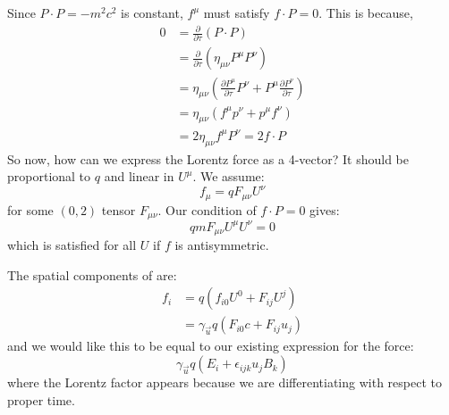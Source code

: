\documentclass[../Main.tex]{subfiles}
\begin{document}
Since $P \cdot P = -m^2 c^2$ is constant, $f^\mu$ must satisfy $f \cdot P = 0$. This is because,
\begin{align*}
    0 &= \frac{\partial}{\partial \tau}(P \cdot P) \\
    &= \frac{\partial }{\partial \tau} \left(\eta_{\mu \nu} P^\mu P^\nu\right) \\
    &= \eta_{\mu \nu} \left(\frac{\partial P^\mu}{\partial \tau} P^\nu + P^\mu \frac{\partial P^\nu}{\partial \tau}\right) \\
    &= \eta_{\mu \nu} \left(f^\mu p^\nu + p^\mu f^\nu\right)\\
    &= 2\eta_{\mu \nu} f^\mu P^\nu = 2f \cdot P
\end{align*}
So now, how can we express the Lorentz force as a 4-vector? It should be proportional to $q$ and linear in $U^\mu$. We assume:
\begin{equation}
    f_\mu = qF_{\mu \nu} U^\nu
    \label{eqnForceGuess}
\end{equation}
for some $(0, 2)$ tensor $F_{\mu\nu}$. Our condition of $f \cdot P = 0$ gives:
\begin{equation*}
    qm F_{\mu \nu} U^\mu U^\nu = 0
\end{equation*}
which is satisfied for all $U$ if $f$ is antisymmetric.

The spatial components of  are:
\begin{align*}
    f_i &= q\left(f_{i0} U^0 + F_{ij} U^j\right) \\
    &= \gamma_{\vec{u}} q \left(F_{i0} c + F_{ij} u_j\right)
\end{align*}
and we would like this to be equal to our existing expression for the force:
\begin{equation*}
    \gamma_{\vec{u}} q(E_i + \epsilon_{ijk} u_j B_k)
\end{equation*}
where the Lorentz factor appears because we are differentiating with respect to proper time.
\end{document}
